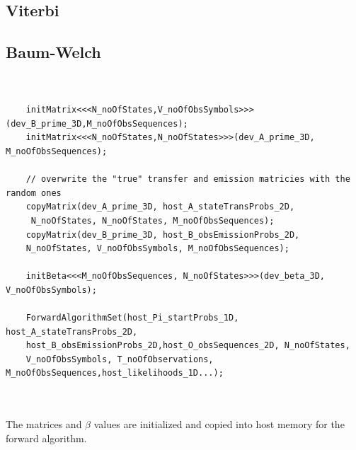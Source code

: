 \documentclass[english, paper=a4]{scrartcl}
\begin{document}
\subsection{Viterbi}

\subsection{Baum-Welch}

\begin{verbatim}


	initMatrix<<<N_noOfStates,V_noOfObsSymbols>>>(dev_B_prime_3D,M_noOfObsSequences);
	initMatrix<<<N_noOfStates,N_noOfStates>>>(dev_A_prime_3D, M_noOfObsSequences);
	
	// overwrite the "true" transfer and emission matricies with the random ones
	copyMatrix(dev_A_prime_3D, host_A_stateTransProbs_2D,
	 N_noOfStates, N_noOfStates, M_noOfObsSequences);
	copyMatrix(dev_B_prime_3D, host_B_obsEmissionProbs_2D, 
	N_noOfStates, V_noOfObsSymbols, M_noOfObsSequences);
	
	initBeta<<<M_noOfObsSequences, N_noOfStates>>>(dev_beta_3D, V_noOfObsSymbols);
	
	ForwardAlgorithmSet(host_Pi_startProbs_1D, host_A_stateTransProbs_2D, 
	host_B_obsEmissionProbs_2D,host_O_obsSequences_2D, N_noOfStates, 
	V_noOfObsSymbols, T_noOfObservations, M_noOfObsSequences,host_likelihoods_1D...);
	
	
\end{verbatim}

The matrices and $\beta$ values are initialized and copied into host memory for the forward algorithm.
	
\end{document}
